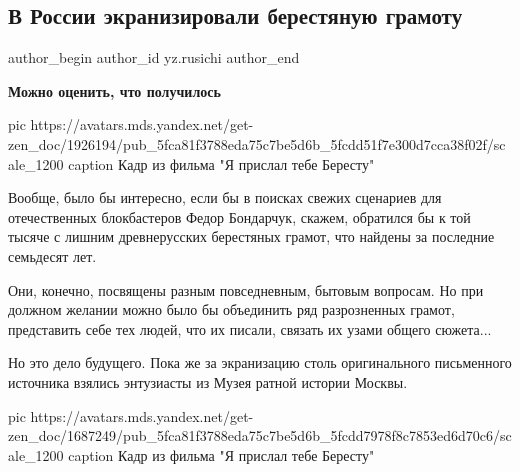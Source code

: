 
 
 
 
 
 
\subsection{В России экранизировали берестяную грамоту}
\label{sec:09_12_2020.sites.ru.zen_yandex.yz.rusichi.1.film_beresta_gramota}
\ifcmt
	author_begin
   author_id yz.rusichi
	author_end
\fi


\textbf{Можно оценить, что получилось}

\ifcmt
  pic https://avatars.mds.yandex.net/get-zen_doc/1926194/pub_5fca81f3788eda75c7be5d6b_5fcdd51f7e300d7cca38f02f/scale_1200
  caption Кадр из фильма "Я прислал тебе Бересту"
\fi

Вообще, было бы интересно, если бы в поисках свежих сценариев для отечественных
блокбастеров Федор Бондарчук, скажем, обратился бы к той тысяче с лишним
древнерусских берестяных грамот, что найдены за последние семьдесят лет.

Они, конечно, посвящены разным повседневным, бытовым вопросам. Но при должном
желании можно было бы объединить ряд разрозненных грамот, представить себе тех
людей, что их писали, связать их узами общего сюжета...

Но это дело будущего. Пока же за экранизацию столь оригинального письменного
источника взялись энтузиасты из Музея ратной истории Москвы.

\ifcmt
  pic https://avatars.mds.yandex.net/get-zen_doc/1687249/pub_5fca81f3788eda75c7be5d6b_5fcdd7978f8c7853ed6d70c6/scale_1200
  caption Кадр из фильма "Я прислал тебе Бересту"
\fi


